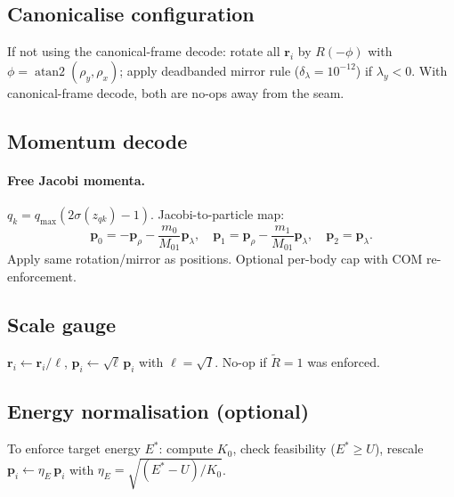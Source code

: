 \documentclass[11pt]{report}
\DeclareMathOperator{\atanTwo}{atan2}
\begin{document}
\subsection{Canonicalise configuration}
\label{sec:canon_config}

If not using the canonical-frame decode: rotate all $\mathbf r_i$ by $R(-\phi)$ with $\phi=\atanTwo(\rho_y,\rho_x)$; apply deadbanded mirror rule ($\delta_\lambda=10^{-12}$) if $\lambda_y<0$. With canonical-frame decode, both are no-ops away from the seam.

\subsection{Momentum decode}
\label{sec:jacobi_mom}

\paragraph{Free Jacobi momenta.} $q_k = q_{\max}(2\sigma(z_{qk})-1)$. Jacobi-to-particle map:
\[
\mathbf p_0=-\mathbf p_\rho - \frac{m_0}{M_{01}}\mathbf p_\lambda,\quad \mathbf p_1=\mathbf p_\rho - \frac{m_1}{M_{01}}\mathbf p_\lambda,\quad \mathbf p_2=\mathbf p_\lambda.
\]
Apply same rotation/mirror as positions. Optional per-body cap with COM re-enforcement.

\subsection{Scale gauge}
\label{sec:scale_gauge}

$\mathbf r_i \leftarrow \mathbf r_i/\ell$, $\mathbf p_i \leftarrow \sqrt\ell\,\mathbf p_i$ with $\ell=\sqrt{I}$. No-op if $\tilde R=1$ was enforced.

\subsection{Energy normalisation (optional)}
\label{sec:energy_norm}

To enforce target energy $E^*$: compute $K_0$, check feasibility ($E^*\ge U$), rescale $\mathbf p_i \leftarrow \eta_E\,\mathbf p_i$ with $\eta_E = \sqrt{(E^*-U)/K_0}$.
\end{document}
